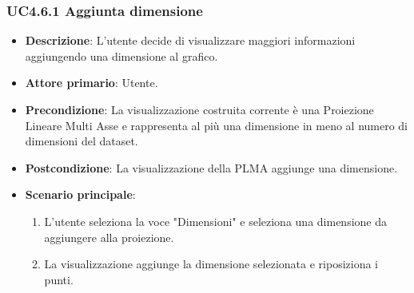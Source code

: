 \subsubsection{UC4.6.1 Aggiunta dimensione}
\label{ssub:uc4.6.1}
\begin{itemize}
    \item \textbf{Descrizione}: L’utente decide di visualizzare maggiori informazioni
                                aggiungendo una dimensione al grafico.

    \item \textbf{Attore primario}: Utente.
    
    \item \textbf{Precondizione}:   La visualizzazione costruita corrente è una Proiezione Lineare Multi Asse
                                    e rappresenta al più una dimensione in meno al numero di dimensioni del dataset.
    \item \textbf{Postcondizione}:  La visualizzazione della PLMA aggiunge una dimensione.

	\item \textbf{Scenario principale}:
        \begin{enumerate}
            \item L'utente seleziona la voce "Dimensioni" e seleziona una dimensione da aggiungere alla proiezione.
            \item La visualizzazione aggiunge la dimensione selezionata e riposiziona i punti.
           
        \end{enumerate}
\end{itemize}

